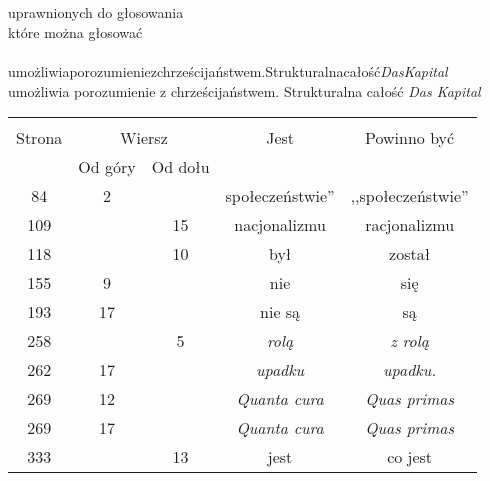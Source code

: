 \documentclass[a4paper,11pt]{article}
\begin{document}
\noindent \\
 \\
\Jest uprawnionych do głosowania \\
\Pow które można głosować \\
 \\
\Jest umożliwiaporozumieniezchrześcijaństwem.Strukturalnacałość\emph{DasKapital} \\
\Pow umożliwia porozumienie z chrześcijaństwem. Strukturalna całość
\emph{Das Kapital} \\

\vspace{\spaceTwo}







\begin{center}
  \begin{tabular}{|c|c|c|c|c|}
    \hline
    & \multicolumn{2}{c|}{} & & \\
    Strona & \multicolumn{2}{c|}{Wiersz} & Jest
                              & Powinno być \\ \cline{2-3}
    & Od góry & Od dołu & & \\
    \hline
    84  &  2 & & społeczeństwie'' & ,,społeczeństwie'' \\
    109 & & 15 & nacjonalizmu & racjonalizmu \\
    118 & & 10 & był & został \\
    155 &  9 & & nie & się \\
    193 & 17 & & nie są & są \\
    258 & &  5 & \emph{rolą} & \emph{z rolą} \\
    262 & 17 & & \emph{upadku} & \emph{upadku.} \\
    269 & 12 & & \emph{Quanta cura} & \emph{Quas primas} \\
    269 & 17 & & \emph{Quanta cura} & \emph{Quas primas} \\
    333 & & 13 & jest & co jest \\
    \hline
  \end{tabular}
\end{center}

\vspace{\spaceTwo}
\end{document}
